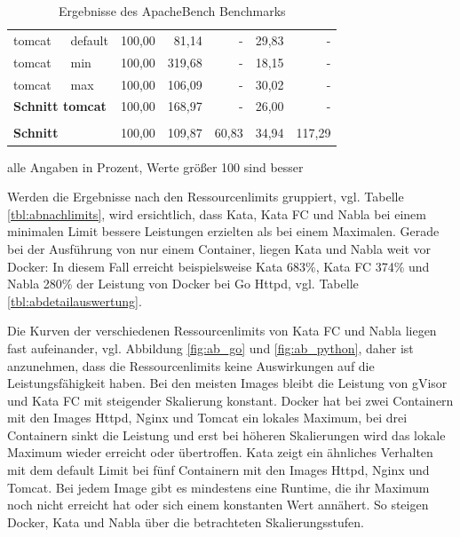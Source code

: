 \begin{table}[h]
\begin{tabularx}{\textwidth}{Xlrrrrr}
		tomcat                  & default          & 100,00     & 81,14  & -       & 29,83  & -      \\
		tomcat                  & min              & 100,00     & 319,68 & -       & 18,15  & -      \\
		tomcat                  & max              & 100,00     & 106,09 & -       & 30,02  & -      \\ \hline
		\multicolumn{2}{l}{\textbf{Schnitt tomcat}}         & 100,00     & 168,97 & -       & 26,00     & -      \\ \hline
		&                  &        &        &         &        &        \\ \hline
		\textbf{Schnitt}                 &                  & 100,00     & 109,87 & 60,83   & 34,94  & 117,29 \\ 
		\hline
	\end{tabularx}
	\caption[Ergebnisse des ApacheBench Benchmarks]{Ergebnisse des ApacheBench Benchmarks}
	\footnotesize alle Angaben in Prozent, Werte größer 100 sind besser
	\label{tbl:abergebniss}
\end{table}

Werden die Ergebnisse nach den Ressourcenlimits gruppiert, vgl. Tabelle \ref{tbl:abnachlimits}, wird ersichtlich, dass Kata, Kata FC und Nabla bei einem minimalen Limit bessere Leistungen erzielten als bei einem Maximalen. Gerade bei der Ausführung von nur einem Container, liegen Kata und Nabla weit vor Docker: In diesem Fall erreicht beispielsweise Kata 683\%, Kata FC 374\% und Nabla 280\% der Leistung von Docker bei  Go Httpd, vgl. Tabelle \ref{tbl:abdetailauswertung}.

Die Kurven der verschiedenen Ressourcenlimits von Kata FC und Nabla liegen fast aufeinander, vgl. Abbildung \ref{fig:ab_go} und \ref{fig:ab_python}, daher ist anzunehmen, dass die Ressourcenlimits keine Auswirkungen auf die Leistungsfähigkeit haben.
Bei den meisten Images bleibt die Leistung von gVisor und Kata FC mit steigender Skalierung konstant. Docker hat bei zwei Containern mit den Images Httpd, Nginx und Tomcat ein lokales Maximum, bei drei Containern sinkt die Leistung und erst bei höheren Skalierungen wird das lokale Maximum wieder erreicht oder übertroffen. Kata zeigt ein ähnliches Verhalten mit dem default Limit bei fünf Containern mit den Images Httpd, Nginx und Tomcat.
Bei jedem Image gibt es mindestens eine Runtime, die ihr Maximum noch nicht erreicht hat oder sich einem konstanten Wert annähert. So steigen Docker, Kata und Nabla über die betrachteten Skalierungsstufen. 

